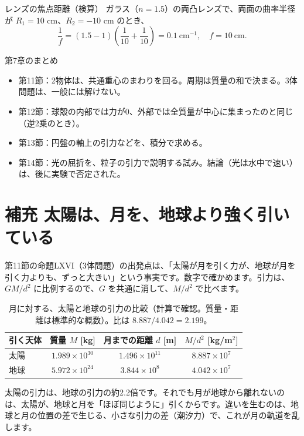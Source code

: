\documentclass[a4paper,11pt,openany]{ltjsbook}
\begin{document}
\begin{examplebox}{レンズの焦点距離（検算）}
ガラス（$n=1.5$）の両凸レンズで、両面の曲率半径が $R_1=10$ cm、$R_2=-10$ cm のとき、
\[
\frac1f=(1.5-1)\left(\frac1{10}+\frac1{10}\right)=0.1\ \mathrm{cm^{-1}},\quad f=10\ \text{cm}.
\]
\end{examplebox}

\begin{pointbox}{第7章のまとめ}
\begin{itemize}[leftmargin=1.5em]
\item 第11節：2物体は、共通重心のまわりを回る。周期は質量の和で決まる。3体問題は、一般には解けない。
\item 第12節：球殻の内部では力が0、外部では全質量が中心に集まったのと同じ（逆2乗のとき）。
\item 第13節：円盤の軸上の引力などを、積分で求める。
\item 第14節：光の屈折を、粒子の引力で説明する試み。結論（光は水中で速い）は、後に実験で否定された。
\end{itemize}
\end{pointbox}

\section{補充 太陽は、月を、地球より強く引いている}

第11節の命題LXVI（3体問題）の出発点は、「太陽が月を引く力が、地球が月を引く力よりも、ずっと大きい」という事実です。数字で確かめます。引力は、$GM/d^2$ に比例するので、$G$ を共通に消して、$M/d^2$ で比べます。

\begin{table}[htbp]
\centering
\begin{tabular}{lccc}
\toprule
引く天体 & 質量 $M$ [kg] & 月までの距離 $d$ [m] & $M/d^2$ [kg/m$^2$]\\
\midrule
太陽 & $1.989\times10^{30}$ & $1.496\times10^{11}$ & $8.887\times10^{7}$\\
地球 & $5.972\times10^{24}$ & $3.844\times10^{8}$ & $4.042\times10^{7}$\\
\bottomrule
\end{tabular}
\caption{月に対する、太陽と地球の引力の比較（計算で確認。質量・距離は標準的な概数）。比は $8.887/4.042=2.199$。}
\end{table}

太陽の引力は、地球の引力の約2.2倍です。それでも月が地球から離れないのは、太陽が、地球と月を「ほぼ同じように」引くからです。違いを生むのは、地球と月の位置の差で生じる、小さな引力の差（潮汐力）で、これが月の軌道を乱します。
\end{document}
